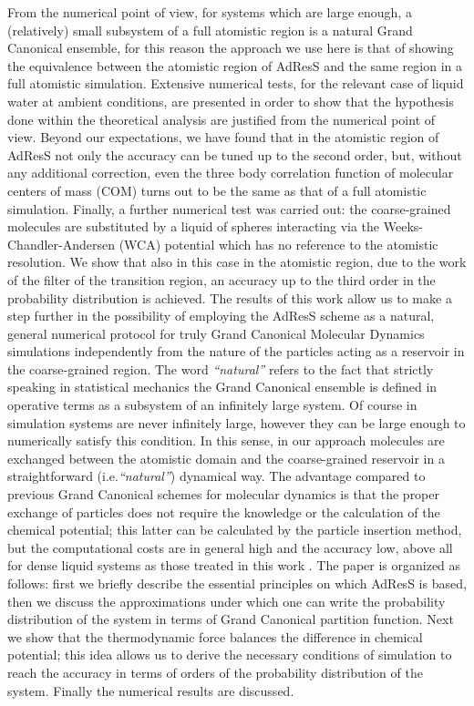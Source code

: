 \documentclass[aip,jcp,a4paper,reprint,onecolumn]{revtex4-1}
\newcommand{\bluec}[1]{{\color{blue} #1}}
\begin{document}
From the numerical point of view, for systems which are large enough, a (relatively) small subsystem of a full atomistic region is a 
natural Grand Canonical ensemble, for this reason the approach we use here is that of showing the equivalence between the atomistic region of AdResS and the same region in a full atomistic simulation.
Extensive numerical tests, for the relevant case of liquid water at ambient conditions, are presented in order to show that the hypothesis done within the theoretical analysis are justified from the numerical point of view. Beyond our expectations, we have found that in the atomistic region of AdResS not only the accuracy can be tuned up to the second order, but, without any additional correction, even the three body correlation function of molecular centers of mass (COM) turns out to be the same as that of a full atomistic simulation. Finally, a further numerical test was carried out: the coarse-grained molecules are substituted by a liquid of spheres interacting via the Weeks-Chandler-Andersen (WCA)  potential \cite{wca} which \bluec{has} no reference to the atomistic resolution. We show that also in this case in the atomistic region, due to the work of the filter of the transition region, an accuracy up to the third order in the probability distribution is achieved.
The results of this work allow us to make a step further in the possibility of employing the AdResS scheme as a natural, general numerical protocol for truly Grand Canonical Molecular Dynamics simulations
independently from the nature of the particles acting as a reservoir in the coarse-grained region. The word {\it ``natural''} refers to the fact  that strictly speaking in statistical mechanics the Grand Canonical ensemble is defined in operative terms as a subsystem of an infinitely large system. Of course in simulation systems are never infinitely large, however they can be large enough to numerically satisfy this condition. 
In this sense, in our approach molecules are exchanged between the atomistic domain and the coarse-grained reservoir in a straightforward (i.e.{\it ``natural''}) dynamical way. The advantage compared to previous Grand Canonical schemes for molecular dynamics is that the proper exchange of particles does not require the knowledge or the calculation of the chemical potential; this latter can be calculated by the particle insertion method, but the computational costs are in general high and the accuracy low, above all for dense liquid systems as those treated in this work \cite{pet1,pet2,pet3,pet4,pet5,flo}. 
The paper is organized as follows: first we briefly describe the essential principles on which AdResS is based, then we discuss the approximations under which one can write the probability distribution of the system in terms of Grand Canonical partition function. Next we show that the thermodynamic force balances the difference in chemical potential; this idea allows us to derive the necessary conditions of simulation to reach the accuracy in terms of orders of the probability distribution of the system. 
Finally the numerical results are discussed.
\end{document}
